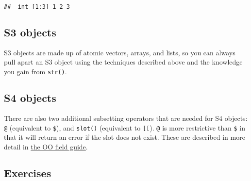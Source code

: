\begin{Shaded}
\begin{Highlighting}[]
\NormalTok{(df[, }\NormalTok{])}
\end{Highlighting}
\end{Shaded}

\begin{verbatim}
##  int [1:3] 1 2 3
\end{verbatim}

\hypertarget{s3-objects}{%
\subsection{S3 objects}\label{s3-objects}}

S3 objects are made up of atomic vectors, arrays, and lists, so you can
always pull apart an S3 object using the techniques described above and
the knowledge you gain from \texttt{str()}. 

\hypertarget{s4-objects}{%
\subsection{S4 objects}\label{s4-objects}}

There are also two additional subsetting operators that are needed for
S4 objects: \texttt{@} (equivalent to \texttt{\$}), and \texttt{slot()}
(equivalent to \texttt{{[}{[}}). \texttt{@} is more restrictive than
\texttt{\$} in that it will return an error if the slot does not exist.
These are described in more detail in \protect\hyperlink{s4}{the OO
field guide}.   

\hypertarget{exercises}{%
\subsection{Exercises}\label{exercises}}


